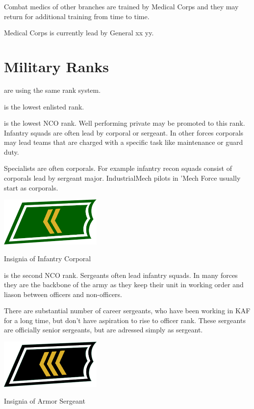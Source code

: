 \documentclass{tufte-book}
\begin{document}
Combat medics of other branches are trained by Medical Corps and they may
return for additional training from time to time.

Medical Corps is currently lead by General xx yy.

\section{Military Ranks}
\label{sc:military_ranks}

 are using the same rank system.

 is the lowest enlisted rank.

 is the lowest NCO rank. Well performing private may be
promoted to this rank. Infantry squads are often lead by corporal or sergeant.
In other forces corporals may lead teams that are charged with a specific
task like maintenance or guard duty.

Specialists are often corporals. For example infantry recon squads consist
of corporals lead by sergeant major. IndustrialMech pilots in 'Mech Force
usually start as corporals.

\begin{marginfigure}[0\baselineskip]
  \includegraphics[width=5.0cm]{rank-corporal}
  \caption{Insignia of Infantry Corporal}
  \label{fig:insignia_corporal}
\end{marginfigure}

 is the second NCO rank. Sergeants often lead infantry
squads. In many forces they are the backbone of the army as they keep their
unit in working order and liason between officers and non-officers.

There are substantial number of career sergeants, who have been working in
KAF for a long time, but don't have aspiration to rise to officer rank. These
sergeants are officially senior sergeants, but are adressed simply as
sergeant.

\begin{marginfigure}[0\baselineskip]
  \includegraphics[width=5.0cm]{rank-sergeant}
  \caption{Insignia of Armor Sergeant}
  \label{fig:insignia_sergeant}
\end{marginfigure}
\end{document}
